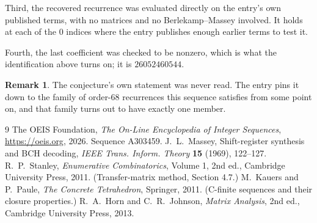 \documentclass[11pt,a4paper]{article}
\theoremstyle{plain}
\theoremstyle{definition}
\newtheorem{remark}[theorem]{Remark}
\begin{document}
Third, the recovered recurrence was evaluated directly on the entry's own published terms, with
no matrices and no Berlekamp--Massey involved. It holds at each of the $0$ indices where
the entry publishes enough earlier terms to test it.

Fourth, the last coefficient was checked to be nonzero, which is what the identification above
turns on; it is $26052460544$.

\begin{remark}
The conjecture's own statement was never read. The entry pins it down to the family of
order-$68$ recurrences this sequence satisfies from some point on, and that family turns
out to have exactly one member.
\end{remark}

\begin{thebibliography}{9}
 The OEIS Foundation, \emph{The On-Line Encyclopedia of Integer
Sequences}, \url{https://oeis.org}, 2026. Sequence A303459.
 J.~L.~Massey, Shift-register synthesis and BCH decoding, \emph{IEEE
Trans. Inform. Theory} \textbf{15} (1969), 122--127.
 R.~P.~Stanley, \emph{Enumerative Combinatorics}, Volume 1, 2nd ed.,
Cambridge University Press, 2011. (Transfer-matrix method, Section 4.7.)
 M.~Kauers and P.~Paule, \emph{The Concrete Tetrahedron}, Springer, 2011.
(C-finite sequences and their closure properties.)
 R.~A.~Horn and C.~R.~Johnson, \emph{Matrix Analysis}, 2nd ed., Cambridge
University Press, 2013.
\end{thebibliography}
\end{document}

